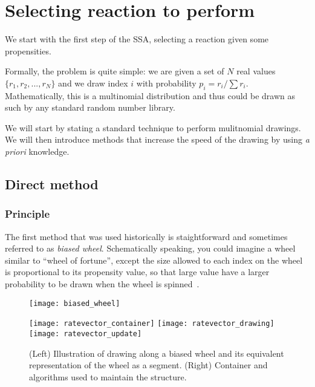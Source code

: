 \section {Selecting reaction to perform}
\label{sec:reaction_selection}

We start with the first step of the SSA, selecting a reaction given some propensities. 

Formally, the problem is quite simple: we are given a set of $N$ real values $\{ r_1, r_2, ..., r_N \}$ and we draw index $i$ with probability $p_i = r_i / \sum r_i$. Mathematically, this is a multinomial distribution and thus could be drawn as such by any standard random number library.

We will start by stating a standard technique to perform mulitnomial drawings. We will then introduce methods that increase the speed of the drawing by using \textit {a priori} knowledge.

\subsection {Direct method}

\subsubsection {Principle}

The first method that was used historically is staightforward and sometimes referred to as \textit {biased wheel}. Schematically speaking, you could imagine a wheel similar to ``wheel of fortune'', except the size allowed to each index on the wheel is proportional to its propensity value, so that large value have a larger probability to be drawn when the wheel is spinned~.

\begin{figure}[!h]
  \centering
  \begin{minipage}{\textwidth}
    \begin{minipage}{0.5\textwidth}
      \texttt{[image: biased\_wheel]}
    \end{minipage}
    \begin{minipage}{0.5\textwidth}
      \texttt{[image: ratevector\_container]}
      \texttt{[image: ratevector\_drawing]}
      \texttt{[image: ratevector\_update]}
    \end{minipage}
  \end{minipage}
  \caption{(Left) Illustration of drawing along a biased wheel and its equivalent representation of the wheel as a segment. (Right) Container and algorithms used to maintain the structure.}
  \label{fig:biased_wheel}
\end {figure}

